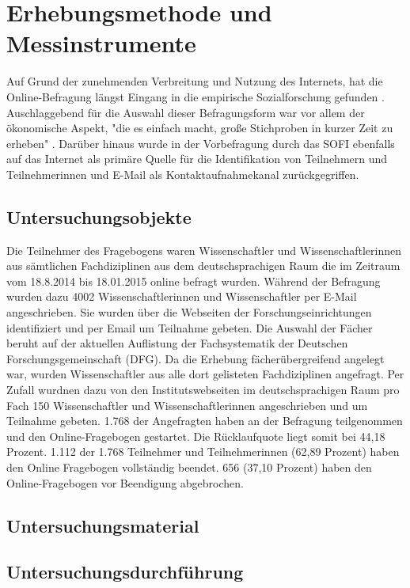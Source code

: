 \section{Erhebungsmethode und Messinstrumente}

Auf Grund der zunehmenden Verbreitung und Nutzung des Internets, hat die Online-Befragung längst Eingang in die empirische Sozialforschung gefunden \cite{Pannewitz_2002}. Auschlaggebend für die Auswahl dieser Befragungsform war vor allem der ökonomische Aspekt, "die es einfach macht, große Stichproben in kurzer Zeit zu erheben" \cite{eichhorn_2004_online}. Darüber hinaus wurde in der Vorbefragung durch das SOFI ebenfalls auf das Internet als primäre Quelle für die Identifikation von Teilnehmern und Teilnehmerinnen und E-Mail als Kontaktaufnahmekanal zurückgegriffen.

\subsection{Untersuchungsobjekte}

Die Teilnehmer des Fragebogens waren Wissenschaftler und Wissenschaftlerinnen aus sämtlichen Fachdiziplinen aus dem deutschsprachigen Raum die im Zeitraum vom 18.8.2014 bis 18.01.2015 online befragt wurden. Während der Befragung wurden dazu 4002 Wissenschaftlerinnen und Wissenschaftler per E-Mail angeschrieben. Sie wurden über die Webseiten der Forschungseinrichtungen identifiziert und per Email um Teilnahme gebeten. Die Auswahl der Fächer beruht auf der aktuellen Auflistung der Fachsystematik der Deutschen Forschungsgemeinschaft (DFG). Da die Erhebung fächerübergreifend angelegt war, wurden Wissenschaftler aus alle dort gelisteten Fachdiziplinen angefragt. Per Zufall wurdnen dazu von den Institutswebseiten im deutschsprachigen Raum pro Fach 150 Wissenschaftler und Wissenschaftlerinnen angeschrieben und um Teilnahme gebeten. 1.768 der Angefragten haben an der Befragung teilgenommen und den Online-Fragebogen gestartet. Die Rücklaufquote liegt somit bei 44,18 Prozent. 1.112 der 1.768 Teilnehmer und Teilnehmerinnen (62,89 Prozent) haben den Online Fragebogen vollständig beendet. 656 (37,10 Prozent) haben den Online-Fragebogen vor Beendigung abgebrochen. 


\subsection{Untersuchungsmaterial}

\subsection{Untersuchungsdurchführung}





